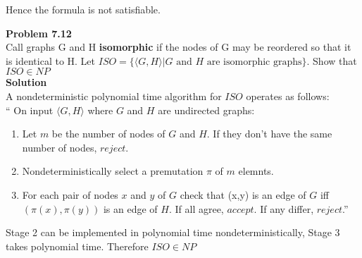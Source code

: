 \documentclass{article}
\newcommand\curl[1]{\{#1\}}
\newcommand{\problem}[1]{\large{\textbf{Problem #1}}\\}
\begin{document}
    Hence the formula is not satisfiable.

\pagebreak

\problem{7.12}
Call graphs G and H \textbf{isomorphic} if the nodes of G may be reordered so that it is identical to H. 
Let $ISO = \curl{\langle G, H \rangle | G \text{ and } H \text{ are isomorphic graphs}}$. Show that
$ISO \in NP$ \\

\textbf{Solution}\\

A nondeterministic polynomial time algorithm for $ISO$ operates as follows:\\
`` On input $\langle G, H \rangle$ where $G$ and $H$ are undirected graphs:
    \begin{enumerate}[1., leftmargin = 0.6cm]
    \itemsep0em
    \item  Let $m$ be the number of nodes of $G$ and $H$. If they don't have the same number of nodes, $reject$.
    \item Nondeterministically select a premutation $\pi$ of $m$ elemnts.
    \item For each pair of nodes $x$ and $y$ of $G$ check that (x,y) is an edge of $G$ iff $(\pi(x), \pi(y))$
        is an edge of $H$. If all agree, $accept$. If any differ, $reject$.''
    \end{enumerate}

    Stage 2 can be implemented in polynomial time nondeterministically, Stage 3 takes polynomial time.
    Therefore $ISO \in NP$
 
\end{document}
